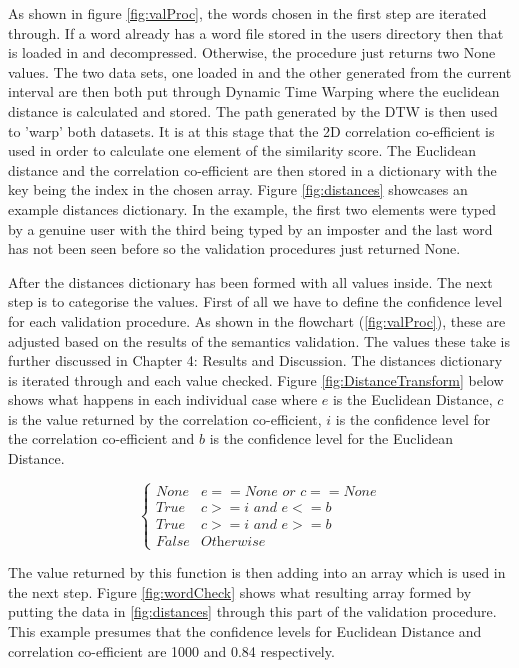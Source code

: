\documentclass[10pt,a4paper]{report}
\begin{document}
As shown in figure \ref{fig:valProc}, the words chosen in the first step are iterated through. If a word already has a word file stored in the users directory then that is loaded in and decompressed. Otherwise, the procedure just returns two None values. The two data sets, one loaded in and the other generated from the current interval are then both put through Dynamic Time Warping where the euclidean distance is calculated and stored. The path generated by the DTW is then used to 'warp' both datasets. It is at this stage that the 2D correlation co-efficient is used in order to calculate one element of the similarity score. The Euclidean distance and the correlation co-efficient are then stored in a dictionary with the key being the index in the chosen array. Figure \ref{fig:distances} showcases an example distances dictionary. In the example, the first two elements were typed by a genuine user with the third being typed by an imposter and the last word has not been seen before so the validation procedures just returned None.

After the distances dictionary has been formed with all values inside. The next step is to categorise the values. First of all we have to define the confidence level for each validation procedure. As shown in the flowchart (\ref{fig:valProc}), these are adjusted based on the results of the semantics validation. The values these take is further discussed in Chapter 4: Results and Discussion. The distances dictionary is iterated through and each value checked. Figure \ref{fig:DistanceTransform} below shows what happens in each individual case where \(e\) is the Euclidean Distance, \(c\) is the value returned by the correlation co-efficient, \(i\) is the confidence level for the correlation co-efficient and \(b\) is the confidence level for the Euclidean Distance.

\begin{equation}
	\begin{cases}
		\textit{None} & e == \textit{None or } c == \textit{None} \\
		\textit{True} & c >= i \textit{ and } e <= b \\
		\textit{True} & c >= i \textit{ and } e >= b \\
		\textit{False} & \textit{Otherwise}
	\end{cases}
	\label{fig:DistanceTransform}
\end{equation}

The value returned by this function is then adding into an array which is used in the next step. Figure \ref{fig:wordCheck} shows what resulting array formed by putting the data in \ref{fig:distances} through this part of the validation procedure. This example presumes that the confidence levels for Euclidean Distance and correlation co-efficient are 1000 and 0.84 respectively.
\end{document}
